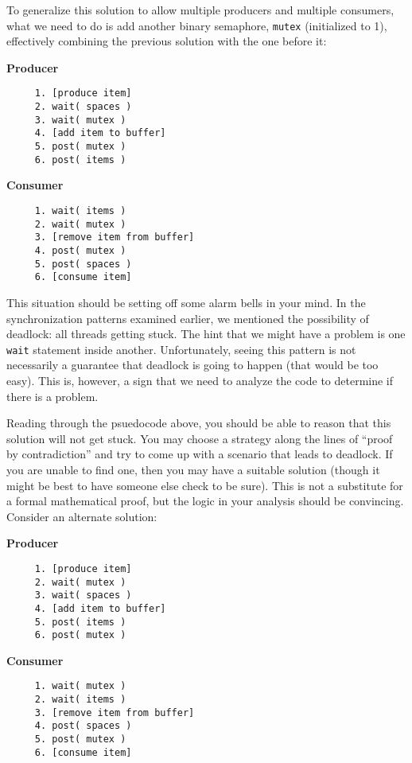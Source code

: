 To generalize this solution to allow multiple producers and multiple consumers, what we need to do is add another binary semaphore, \texttt{mutex} (initialized to 1), effectively combining the previous solution with the one before it:

\begin{multicols}{2}
	\textbf{Producer}\vspace{-2em}
	\begin{verbatim}
	 1. [produce item]
	 2. wait( spaces )
	 3. wait( mutex )
	 4. [add item to buffer]
	 5. post( mutex )
	 6. post( items )
  \end{verbatim}
	\columnbreak
	\textbf{Consumer}\vspace{-2em}
	\begin{verbatim}
	 1. wait( items )
	 2. wait( mutex )
	 3. [remove item from buffer]
	 4. post( mutex )
	 5. post( spaces )
	 6. [consume item]
  \end{verbatim}
\end{multicols}
\vspace{-2em}

This situation should be setting off some alarm bells in your mind. In the synchronization patterns examined earlier, we mentioned the possibility of deadlock: all threads getting stuck. The hint that we might have a problem is one \texttt{wait} statement inside another. Unfortunately, seeing this pattern is not necessarily a guarantee that deadlock is going to happen (that would be too easy). This is, however, a sign that we need to analyze the code to determine if there is a problem.

Reading through the psuedocode above, you should be able to reason that this solution will not get stuck. You may choose a strategy along the lines of ``proof by contradiction'' and try to come up with a scenario that leads to deadlock. If you are unable to find one, then you may have a suitable solution (though it might be best to have someone else check to be sure). This is not a substitute for a formal mathematical proof, but the logic in your analysis should be convincing. Consider an alternate solution:

\begin{multicols}{2}
	\textbf{Producer}\vspace{-2em}
	\begin{verbatim}
	 1. [produce item]
	 2. wait( mutex )
	 3. wait( spaces )
	 4. [add item to buffer]
	 5. post( items )
	 6. post( mutex )
  \end{verbatim}
	\columnbreak
	\textbf{Consumer}\vspace{-2em}
	\begin{verbatim}
	 1. wait( mutex )
	 2. wait( items )
	 3. [remove item from buffer]
	 4. post( spaces )
	 5. post( mutex )
	 6. [consume item]
  \end{verbatim}
\end{multicols}
\vspace{-2em}

